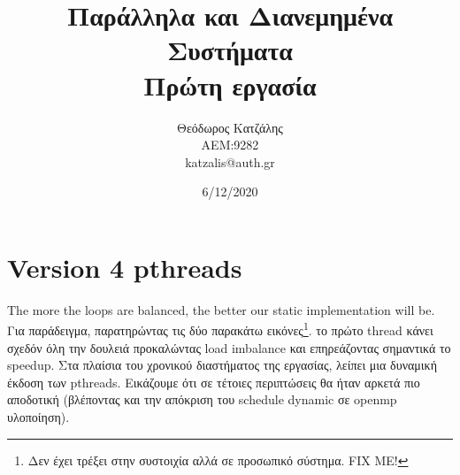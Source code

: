 \documentclass[12pt, a4paper]{article}
\title{\textbf{Παράλληλα και Διανεμημένα Συστήματα \\ Πρώτη εργασία}}
\author{Θεόδωρος Κατζάλης \\ ΑΕΜ:9282 \\ katzalis@auth.gr}
\date{6/12/2020}
\begin{document}
\sloppy
%
\maketitle


\tableofcontents


\section{Version 4 pthreads}


The more the loops are balanced, the better our static implementation will be. Για παράδειγμα, παρατηρώντας τις δύο παρακάτω εικόνες\footnote{Δεν έχει τρέξει στην συστοιχία αλλά σε προσωπικό σύστημα. FIX ME!}. το πρώτο thread κάνει σχεδόν όλη την δουλειά προκαλώντας load imbalance και επηρεάζοντας σημαντικά το speedup. Στα πλαίσια του χρονικού διαστήματος της εργασίας, λείπει μια δυναμική έκδοση των pthreads. Εικάζουμε ότι σε τέτοιες περιπτώσεις θα ήταν αρκετά πιο αποδοτική (βλέποντας και την απόκριση του schedule dynamic σε openmp υλοποίηση).
\end{document}
